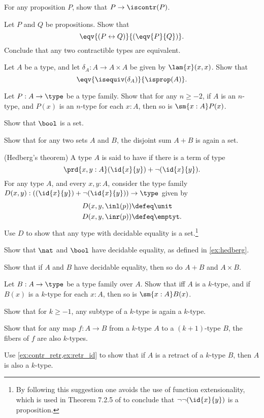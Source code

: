 \begin{exercises}
\item For any proposition $P$, show that $P\to\iscontr(P)$.
\item Let $P$ and $Q$ be propositions. Show that
\begin{equation*}
\eqv{(P\leftrightarrow Q)}{(\eqv{P}{Q})}.
\end{equation*}
Conclude that any two contractible types are equivalent.
\item Let $A$ be a type, and let $\delta_A:A\to A\times A$ be given by $\lam{x}(x,x)$. Show that
\begin{equation*}
\eqv{\isequiv(\delta_A)}{\isprop(A)}.
\end{equation*}
\item Let $P:A\to\type$ be a type family. Show that for any $n\geq-2$, if $A$ is an $n$-type, and $P(x)$ is an $n$-type for each $x:A$, then so is $\sm{x:A}P(x)$. 
\item Show that $\bool$ is a set.
\item Show that for any two sets $A$ and $B$, the disjoint sum $A+B$ is again a set.
\item \label{ex:hedberg}(Hedberg's theorem) A type $A$ is said to have  if there is a term of type
\begin{equation*}
\prd{x,y:A} (\id{x}{y})+\neg(\id{x}{y}).
\end{equation*}
For any type $A$, and every $x,y:A$, consider the type family $D(x,y):((\id{x}{y})+\neg(\id{x}{y}))\to\type$ given by
\begin{align*}
D(x,y,\inl(p)) & \defeq \unit \\
D(x,y,\inr(p)) & \defeq \emptyt.
\end{align*}
Use $D$ to show that any type with decidable equality is a set.\footnote{By following this suggestion one avoids the use of function extensionality, which is used in Theorem 7.2.5 of \cite{hottbook} to conclude that $\neg\neg(\id{x}{y})$ is a proposition.}
\item Show that $\nat$ and $\bool$ have decidable equality, as defined in \autoref{ex:hedberg}.
\item Show that if $A$ and $B$ have decidable equality, then so do $A+B$ and $A\times B$.
\item 
\begin{subexenum}
\item Let $B:A\to\type$ be a type family over $A$. Show that iff $A$ is a $k$-type, and if $B(x)$ is a $k$-type for each $x:A$, then so is $\sm{x:A}B(x)$.
\item Show that for $k\geq -1$, any subtype of a $k$-type is again a $k$-type.
\item Show that for any map $f:A\to B$ from a $k$-type $A$ to a $(k+1)$-type $B$, the fibers of $f$ are also $k$-types.
\end{subexenum}
\item Use \autoref{ex:contr_retr,ex:retr_id} to show that if $A$ is a retract of a $k$-type $B$, then $A$ is also a $k$-type.
\end{exercises}
